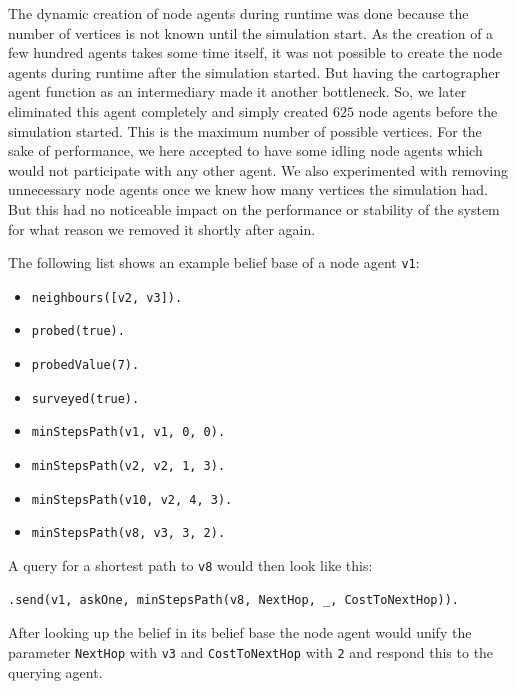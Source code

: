 The dynamic creation of node agents during runtime was done because the number of vertices is not known until the simulation start.
As the creation of a few hundred agents takes some time itself, it was not possible to create the node agents during runtime after the simulation started.
But having the cartographer agent function as an intermediary made it another bottleneck.
So, we later eliminated this agent completely and simply created $625$ node agents before the simulation started.
This is the maximum number of possible vertices.
For the sake of performance, we here accepted to have some idling node agents which would not participate with any other agent.
We also experimented with removing unnecessary node agents once we knew how many vertices the simulation had.
But this had no noticeable impact on the performance or stability of the system for what reason we removed it shortly after again.

\begin{samepage}
The following list shows an example belief base of a node agent \texttt{v1}:
\begin{itemize}
  \item \texttt{neighbours([v2, v3]).}
  \item \texttt{probed(true).}
  \item \texttt{probedValue(7).}
  \item \texttt{surveyed(true).}
  \item \texttt{minStepsPath(v1, v1, 0, 0).}
  \item \texttt{minStepsPath(v2, v2, 1, 3).}
  \item \texttt{minStepsPath(v10, v2, 4, 3).}
  \item \texttt{minStepsPath(v8, v3, 3, 2).}
\end{itemize}
\end{samepage}
A query for a shortest path to \texttt{v8} would then look like this:
\begin{lstlisting}[caption={Query for shortest path from \texttt{v1} to \texttt{v8}}, label={lst:dv_shortestPath_query}]
  .send(v1, askOne, minStepsPath(v8, NextHop, _, CostToNextHop)).
\end{lstlisting}
After looking up the belief in its belief base the node agent would unify the parameter \texttt{NextHop} with \texttt{v3} and \texttt{CostToNextHop} with \texttt{2} and respond this to the querying agent.

